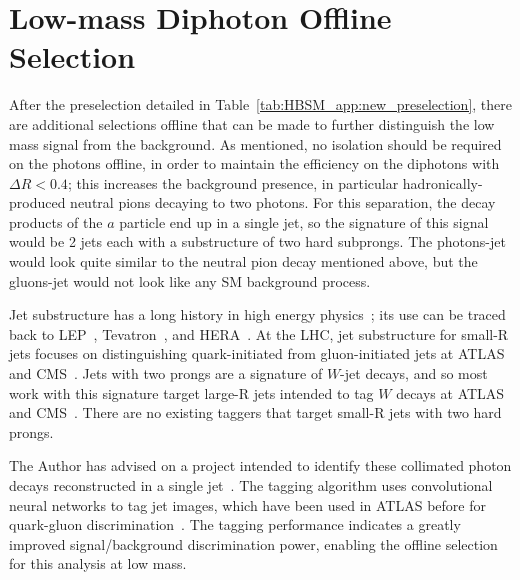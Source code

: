 \section{Low-mass Diphoton Offline Selection}
\label{sec:HBSM_app:lowmass_offline}
After the preselection detailed in Table~\ref{tab:HBSM_app:new_preselection}, there are additional selections offline that can be made to further distinguish the low mass signal from the background.
As mentioned, no isolation should be required on the photons offline, in order to maintain the efficiency on the diphotons with $\Delta R<0.4$; this increases the background presence, in particular hadronically-produced neutral pions decaying to two photons.
For this separation, the decay products of the $a$ particle end up in a single jet, so the signature of this signal would be 2 jets each with a substructure of two hard subprongs.
The photons-jet would look quite similar to the neutral pion decay mentioned above, but the gluons-jet would not look like any SM background process.

Jet substructure has a long history in high energy physics~\cite{Larkoski:2017jix,Asquith:2018igt};
its use can be traced back to LEP~\cite{Alexander:1991ce,Barate:1998cp,Abreu:1995hp,Acciarri:1997it}, Tevatron~\cite{Abe:1992wv,Abachi:1995zw}, and HERA~\cite{Breitweg:1997gg,Breitweg:1998gf,Adloff:1998ni}.
At the LHC, jet substructure for small-R jets focuses on distinguishing quark-initiated from gluon-initiated jets at ATLAS~\cite{ATL-PHYS-PUB-2017-009,Aad:2014gea,ATLAS-CONF-2016-034,ATL-PHYS-PUB-2017-017} and CMS~\cite{CMS-PAS-JME-16-003,CMS-PAS-JME-13-002,CMS-DP-2016-070,CMS-DP-2017-027}.
Jets with two prongs are a signature of $W$-jet decays, and so most work with this signature target large-R jets intended to tag $W$ decays at ATLAS~\cite{Aad:2015rpa,Aaboud:2018psm} and CMS~\cite{Khachatryan:2014vla}.
There are no existing taggers that target small-R jets with two hard prongs.

The Author has advised on a project intended to identify these collimated photon decays reconstructed in a single jet~\cite{mergedphotonid}.
The tagging algorithm uses convolutional neural networks to tag jet images, which have been used in ATLAS before for quark-gluon discrimination~\cite{ATL-PHYS-PUB-2017-017}.
The tagging performance indicates a greatly improved signal/background discrimination power, enabling the offline selection for this analysis at low mass.
